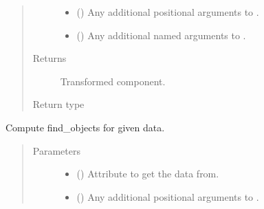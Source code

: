 \documentclass[letterpaper,10pt,english]{sphinxmanual}
\begin{document}
\begin{fulllineitems}
\begin{fulllineitems}
\begin{quote}
\begin{description}
\begin{itemize}
\item {} 
 () \textendash{} Any additional positional arguments to .

\item {} 
 () \textendash{} Any additional named arguments to .

\end{itemize}

\item[{Returns}] \leavevmode
{} \textendash{} Transformed component.

\item[{Return type}] \leavevmode
{\hyperref[\detokenize{api/base_classes:geology.src.base_spatial.SpatialComponent}]{}}

\end{description}\end{quote}

\end{fulllineitems}


\begin{fulllineitems}
\label{\detokenize{api/rock:geology.src.Rock.find_objects}}
Compute find\_objects for given data.
\begin{quote}\begin{description}
\item[{Parameters}] \leavevmode\begin{itemize}
\item {} 
 (\sphinxstyleliteralemphasis{\sphinxupquote{, }}) \textendash{} Attribute to get the data from.

\item {} 
 () \textendash{} Any additional positional arguments to .


\end{itemize}
\end{description}
\end{quote}
\end{fulllineitems}
\end{fulllineitems}
\end{document}

